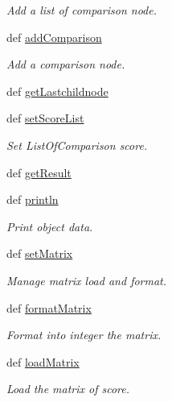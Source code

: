 \begin{DoxyCompactItemize}
\begin{DoxyCompactList}\small\item\em \-Add a list of comparison node. \end{DoxyCompactList}\item 
def \hyperlink{classirna_1_1iRNA__pred_1_1Interaction_1_1Interaction_a73d8cb13d7aca8740017168efc5ddff1}{add\-Comparison}
\begin{DoxyCompactList}\small\item\em \-Add a comparison node. \end{DoxyCompactList}\item 
def \hyperlink{classirna_1_1iRNA__pred_1_1Interaction_1_1Interaction_afe6d827a52ae67eed41bb4d88cc400ca}{get\-Lastchildnode}
\item 
def \hyperlink{classirna_1_1iRNA__pred_1_1Interaction_1_1Interaction_a95e4b5d5cab7e28bad9284c02bac7e69}{set\-Score\-List}
\begin{DoxyCompactList}\small\item\em \-Set \-List\-Of\-Comparison score. \end{DoxyCompactList}\item 
def \hyperlink{classirna_1_1iRNA__pred_1_1Interaction_1_1Interaction_a292f8d98cc8afa966d302975a763577c}{get\-Result}
\item 
def \hyperlink{classirna_1_1iRNA__pred_1_1Interaction_1_1Interaction_ae3a50e35eb5e0a66f910f59e031da8f4}{println}
\begin{DoxyCompactList}\small\item\em \-Print object data. \end{DoxyCompactList}\item 
def \hyperlink{classirna_1_1iRNA__pred_1_1Interaction_1_1Interaction_a8c8d74c8bf184642f4a4080c9e7bfcc4}{set\-Matrix}
\begin{DoxyCompactList}\small\item\em \-Manage matrix load and format. \end{DoxyCompactList}\item 
def \hyperlink{classirna_1_1iRNA__pred_1_1Interaction_1_1Interaction_a1902a2eca460aed1256a20187eb55252}{format\-Matrix}
\begin{DoxyCompactList}\small\item\em \-Format into integer the matrix. \end{DoxyCompactList}\item 
def \hyperlink{classirna_1_1iRNA__pred_1_1Interaction_1_1Interaction_a212efb2758061859d8907005e0932f86}{load\-Matrix}
\begin{DoxyCompactList}\small\item\em \-Load the matrix of score. \end{DoxyCompactList}\item 

\end{DoxyCompactItemize}
